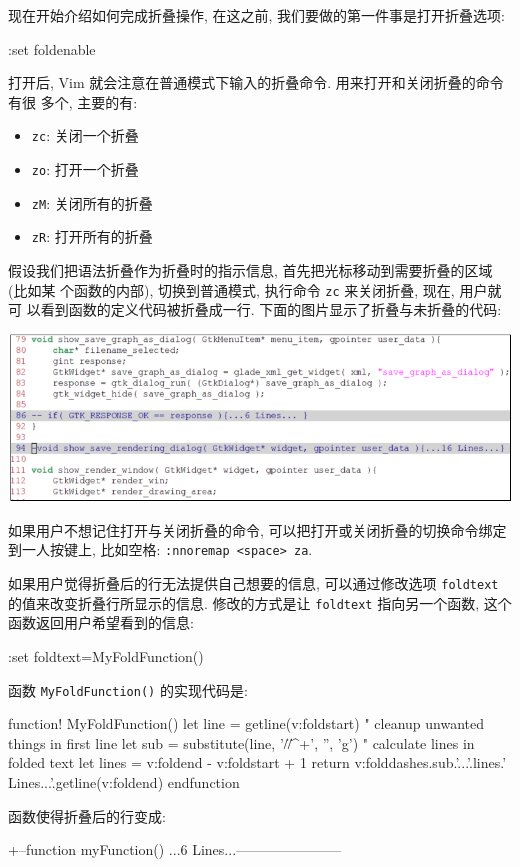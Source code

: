 现在开始介绍如何完成折叠操作, 在这之前, 我们要做的第一件事是打开折叠选项:
\begin{vimcode}
:set foldenable
\end{vimcode}
打开后, Vim 就会注意在普通模式下输入的折叠命令. 用来打开和关闭折叠的命令有很
多个, 主要的有:
\begin{itemize}
    \item \texttt{zc}: 关闭一个折叠
    \item \texttt{zo}: 打开一个折叠
    \item \texttt{zM}: 关闭所有的折叠
    \item \texttt{zR}: 打开所有的折叠
\end{itemize}
假设我们把语法折叠作为折叠时的指示信息, 首先把光标移动到需要折叠的区域 (比如某
个函数的内部), 切换到普通模式, 执行命令 \texttt{zc} 来关闭折叠, 现在, 用户就可
以看到函数的定义代码被折叠成一行. 下面的图片显示了折叠与未折叠的代码:
\begin{center}
\includegraphics[scale=0.7]{./images/page108.png}
\end{center}

\begin{warning}
    如果用户不想记住打开与关闭折叠的命令, 可以把打开或关闭折叠的切换命令绑定
    到一人按键上, 比如空格: \texttt{:nnoremap <space> za}.
\end{warning}

如果用户觉得折叠后的行无法提供自己想要的信息, 可以通过修改选项
\texttt{foldtext} 的值来改变折叠行所显示的信息. 修改的方式是让
\texttt{foldtext} 指向另一个函数, 这个函数返回用户希望看到的信息:
\begin{vimcode}
:set foldtext=MyFoldFunction()
\end{vimcode}
函数 \texttt{MyFoldFunction()} 的实现代码是:
\begin{vimcode}
function! MyFoldFunction()
	let line = getline(v:foldstart)
	" cleanup unwanted things in first line
	let sub = substitute(line, '/\*\|\*/\|^\s+', '', 'g')
	" calculate lines in folded text
	let lines = v:foldend - v:foldstart + 1
	return  v:folddashes.sub.'...'.lines.' Lines...'.getline(v:foldend)
endfunction
\end{vimcode}
函数使得折叠后的行变成:
\begin{vimcode}
+--function myFunction() {...6 Lines...}-----------------------
\end{vimcode}

